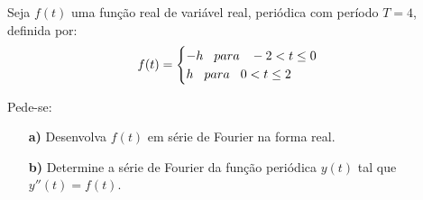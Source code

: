 \linespread{1.5}
Seja $f(t)$ uma função real de variável real, periódica com período $T=4$, definida por:
\begin{equation*}
    f(t) = \begin{cases}
    -h \hspace{0.3cm} para \hspace{0.3cm} -2 < t \leq 0\\
    h \hspace{0.3cm} para \hspace{0.3cm} 0 < t \leq 2
    \end{cases}
\end{equation*}

Pede-se:
\begin{itemize}
    \item[\textbf{a)}] Desenvolva $f(t)$ em série de Fourier na forma real.
    \item[\textbf{b)}] Determine a série de Fourier da função periódica $y(t)$ tal que $y''(t) = f(t)$.
\end{itemize}